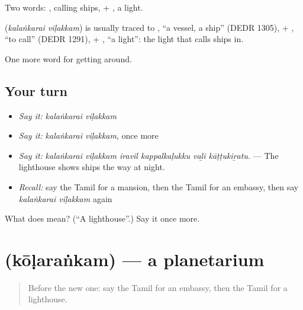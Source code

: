 Two words: , calling ships, + , a light.

\begin{cousinweb}
\textbf{ } (\emph{kalaṅkarai viḷakkam}) is usually traced to , \textquotedblleft{}a vessel, a ship\textquotedblright{} (DEDR 1305), + , \textquotedblleft{}to call\textquotedblright{} (DEDR 1291), + , \textquotedblleft{}a light\textquotedblright{}: the light that calls ships in.
\end{cousinweb}

\begin{grammarlens}[title={What you've built}]
One more word for getting around.
\end{grammarlens}

\subsection*{Your turn}
\begin{itemize}
\raggedright
  \item \emph{Say it:} \emph{kalaṅkarai viḷakkam}
  \item \emph{Say it:} \emph{kalaṅkarai viḷakkam}, once more
  \item \emph{Say it:} \emph{kalaṅkarai viḷakkam iravil kappalkaḷukku vaḻi kāṭṭukiṟatu.} — The lighthouse shows ships the way at night.
  \item \emph{Recall:} say the Tamil for a mansion, then the Tamil for an embassy, then say \emph{kalaṅkarai viḷakkam} again
\end{itemize}

\begin{tcolorbox}[breakable,colback=teal!4,colframe=teal!35!black,title={Before you move on}]
What does   mean? (\textquotedblleft{}A lighthouse\textquotedblright{}.) Say it once more.
\end{tcolorbox}
\section[\texorpdfstring{\ta{கோளரங்கம்} (kōḷaraṅkam)}{கோளரங்கம் (kōḷaraṅkam)}]{ (kōḷaraṅkam) — a planetarium}

\label{lesson:TA-C425-kolarankam}



\begin{quote}
Before the new one: say the Tamil for an embassy, then the Tamil for a lighthouse.
\end{quote}

